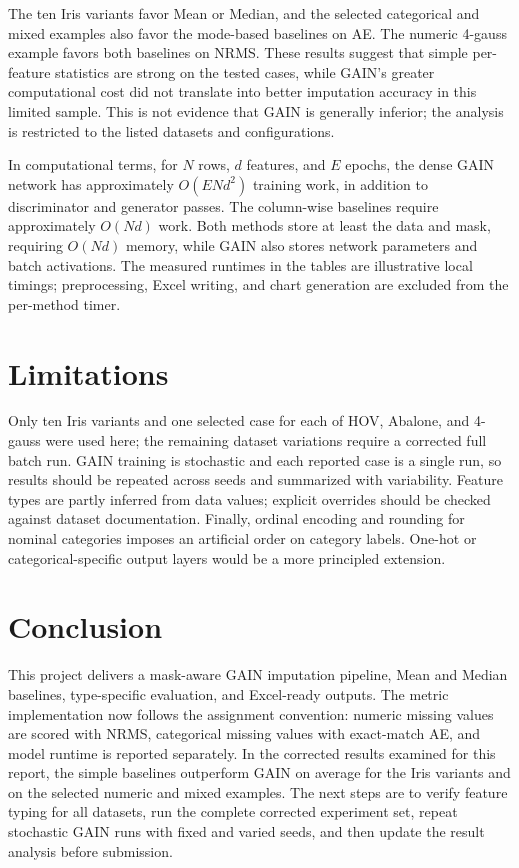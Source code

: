 \documentclass[11pt]{article}
\begin{document}
The ten Iris variants favor Mean or Median, and the selected categorical and mixed examples also favor the mode-based baselines on AE. The numeric 4-gauss example favors both baselines on NRMS. These results suggest that simple per-feature statistics are strong on the tested cases, while GAIN's greater computational cost did not translate into better imputation accuracy in this limited sample. This is not evidence that GAIN is generally inferior; the analysis is restricted to the listed datasets and configurations.

In computational terms, for $N$ rows, $d$ features, and $E$ epochs, the dense GAIN network has approximately $O(ENd^2)$ training work, in addition to discriminator and generator passes. The column-wise baselines require approximately $O(Nd)$ work. Both methods store at least the data and mask, requiring $O(Nd)$ memory, while GAIN also stores network parameters and batch activations. The measured runtimes in the tables are illustrative local timings; preprocessing, Excel writing, and chart generation are excluded from the per-method timer.

\section{Limitations}
Only ten Iris variants and one selected case for each of HOV, Abalone, and 4-gauss were used here; the remaining dataset variations require a corrected full batch run. GAIN training is stochastic and each reported case is a single run, so results should be repeated across seeds and summarized with variability. Feature types are partly inferred from data values; explicit overrides should be checked against dataset documentation. Finally, ordinal encoding and rounding for nominal categories imposes an artificial order on category labels. One-hot or categorical-specific output layers would be a more principled extension.

\section{Conclusion}
This project delivers a mask-aware GAIN imputation pipeline, Mean and Median baselines, type-specific evaluation, and Excel-ready outputs. The metric implementation now follows the assignment convention: numeric missing values are scored with NRMS, categorical missing values with exact-match AE, and model runtime is reported separately. In the corrected results examined for this report, the simple baselines outperform GAIN on average for the Iris variants and on the selected numeric and mixed examples. The next steps are to verify feature typing for all datasets, run the complete corrected experiment set, repeat stochastic GAIN runs with fixed and varied seeds, and then update the result analysis before submission.
\end{document}
